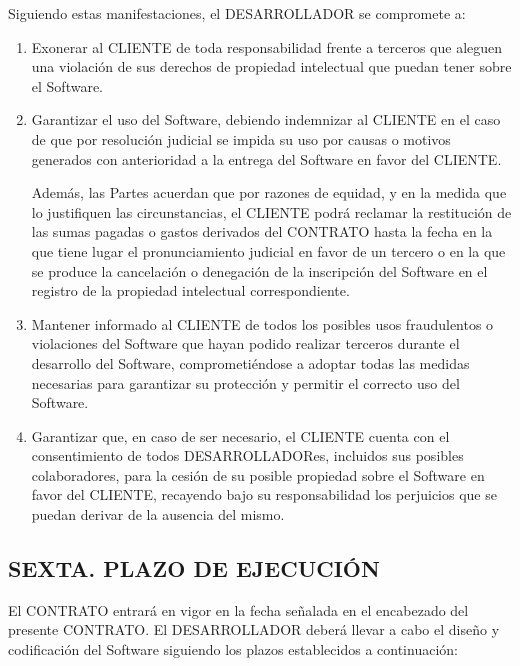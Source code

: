 \documentclass[a4paper,11pt]{report}
\begin{document}
	Siguiendo estas manifestaciones, el DESARROLLADOR se compromete a:

	\begin{enumerate}[label=\Alph*)]
		\item Exonerar al CLIENTE de toda responsabilidad frente a terceros que
		aleguen una violación de sus derechos de propiedad intelectual que
		puedan tener sobre el Software.

		\item Garantizar el uso del Software, debiendo indemnizar al CLIENTE en el
		caso de que por resolución judicial se impida su uso por causas o
		motivos generados con anterioridad a la entrega del Software en favor
		del CLIENTE.

		Además, las Partes acuerdan que por razones de equidad, y en la medida
		que lo justifiquen las circunstancias, el CLIENTE podrá reclamar la
		restitución de las sumas pagadas o gastos derivados del CONTRATO hasta
		la fecha en la que tiene lugar el pronunciamiento judicial en favor de
		un tercero o en la que se produce la cancelación o denegación de la
		inscripción del Software en el registro de la propiedad intelectual
		correspondiente.

		\item Mantener informado al CLIENTE de todos los posibles usos fraudulentos
		o violaciones del Software que hayan podido realizar terceros durante el
		desarrollo del Software, comprometiéndose a adoptar todas las medidas
		necesarias para garantizar su protección y permitir el correcto uso del
		Software.

		\item Garantizar que, en caso de ser necesario, el CLIENTE cuenta con el
		consentimiento de todos DESARROLLADORes, incluidos sus posibles
		colaboradores, para la cesión de su posible propiedad sobre el Software
		en favor del CLIENTE, recayendo bajo su responsabilidad los perjuicios
		que se puedan derivar de la ausencia del mismo.

	\end{enumerate}

	\subsection*{SEXTA. PLAZO DE EJECUCIÓN}

	El CONTRATO entrará en vigor en la fecha señalada en el encabezado del
	presente CONTRATO. El DESARROLLADOR deberá llevar a cabo el diseño y
	codificación del Software siguiendo los plazos establecidos a
	continuación:
\end{document}
